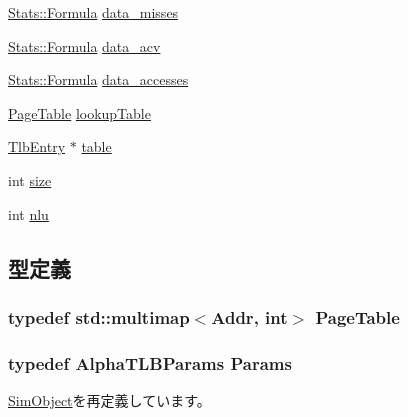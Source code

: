 \begin{DoxyCompactItemize}
\hyperlink{classStats_1_1Formula}{Stats::Formula} \hyperlink{classAlphaISA_1_1TLB_a426c830a47b60eed9fbd6dcb99433a48}{data\_\-misses}
\item 
\hyperlink{classStats_1_1Formula}{Stats::Formula} \hyperlink{classAlphaISA_1_1TLB_acf5209d104ddafaa697af923c7a3c750}{data\_\-acv}
\item 
\hyperlink{classStats_1_1Formula}{Stats::Formula} \hyperlink{classAlphaISA_1_1TLB_a66b0bcc2ec4a983bb2a31a9306157551}{data\_\-accesses}
\item 
\hyperlink{classPageTable}{PageTable} \hyperlink{classAlphaISA_1_1TLB_a4d5c35d797dc31aad758dee75916238f}{lookupTable}
\item 
\hyperlink{structAlphaISA_1_1TlbEntry}{TlbEntry} $\ast$ \hyperlink{classAlphaISA_1_1TLB_a434ae74dec9e8168e4f338aeb18d5931}{table}
\item 
int \hyperlink{classAlphaISA_1_1TLB_a439227feff9d7f55384e8780cfc2eb82}{size}
\item 
int \hyperlink{classAlphaISA_1_1TLB_a4a3ee7780f871ead437ece349ddc2147}{nlu}
\end{DoxyCompactItemize}


\subsection{型定義}
\hypertarget{classAlphaISA_1_1TLB_a18f97eb978c56b976c0eadbf9212d206}{
\subsubsection[{PageTable}]{\setlength{\rightskip}{0pt plus 5cm}typedef std::multimap$<${\bf Addr}, int$>$ {\bf PageTable}}}
\label{classAlphaISA_1_1TLB_a18f97eb978c56b976c0eadbf9212d206}
\hypertarget{classAlphaISA_1_1TLB_a9c268a4095d94dfb9eafa97cb58fcc5b}{
\subsubsection[{Params}]{\setlength{\rightskip}{0pt plus 5cm}typedef AlphaTLBParams {\bf Params}}}
\label{classAlphaISA_1_1TLB_a9c268a4095d94dfb9eafa97cb58fcc5b}


\hyperlink{classSimObject_a0f0761d2db586a23bb2a2880b8f387bb}{SimObject}を再定義しています。

